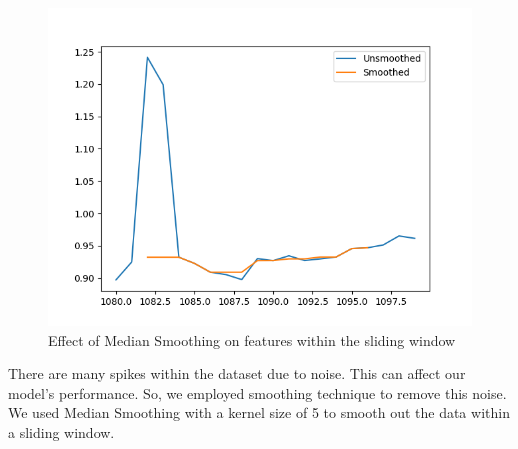 \documentclass[12pt]{article}
\begin{document}
\begin{figure}[h]
\begin{minipage}{0.32\textwidth}
				\end{minipage}
				\hfill
				\begin{minipage}{0.32\textwidth}
					\centering
					\includegraphics[width=\textwidth]{imgs/smoothing_3.png}
				\end{minipage}
				\caption{Effect of Median Smoothing on features within the sliding window}
				\label{fig:three_plots}
			\end{figure}
			\footnotesize{There are many spikes within the dataset due to noise. This can affect our model's performance. So, we employed smoothing technique to remove this noise. We used Median Smoothing with a kernel size of 5 to smooth out the data within a sliding window.}
\end{document}
